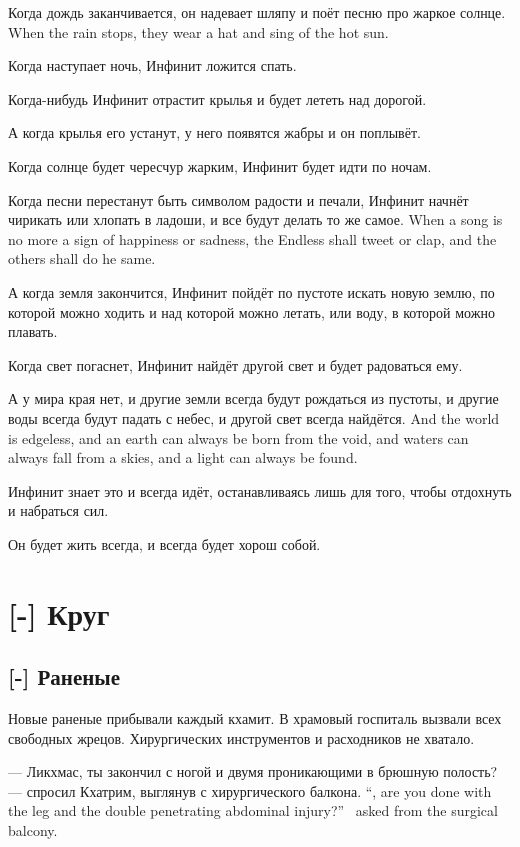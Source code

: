 {Когда дождь заканчивается, он надевает шляпу и поёт песню про жаркое солнце.}
{When the rain stops, they wear a hat and sing of the hot sun.}

Когда наступает ночь, Инфинит ложится спать.

Когда-нибудь Инфинит отрастит крылья и будет лететь над дорогой.

А когда крылья его устанут, у него появятся жабры и он поплывёт.

Когда солнце будет чересчур жарким, Инфинит будет идти по ночам.

{Когда песни перестанут быть символом радости и печали, Инфинит начнёт чирикать или хлопать в ладоши, и все будут делать то же самое.}
{When a song is no more a sign of happiness or sadness, the Endless shall tweet or clap, and the others shall do he same.}

А когда земля закончится, Инфинит пойдёт по пустоте искать новую землю, по которой можно ходить и над которой можно летать, или воду, в которой можно плавать.

Когда свет погаснет, Инфинит найдёт другой свет и будет радоваться ему.

{А у мира края нет, и другие земли всегда будут рождаться из пустоты, и другие воды всегда будут падать с небес, и другой свет всегда найдётся.}
{And the world is edgeless, and an earth can always be born from the void, and waters can always fall from a skies, and a light can always be found.}

Инфинит знает это и всегда идёт, останавливаясь лишь для того, чтобы отдохнуть и набраться сил.

Он будет жить всегда, и всегда будет хорош собой.

\chapter{[-] Круг}

\section{[-] Раненые}

\textspace

Новые раненые прибывали каждый кхамит.
В храмовый госпиталь вызвали всех свободных жрецов.
Хирургических инструментов и расходников не хватало.

{--- Ликхмас, ты закончил с ногой и двумя проникающими в брюшную полость? --- спросил Кхатрим, выглянув с хирургического балкона.}
{``\Likchmas, are you done with the leg and the double penetrating abdominal injury?'' \Kchatrim\ asked from the surgical balcony.}

